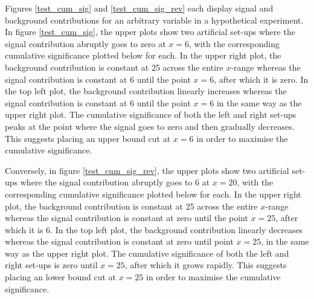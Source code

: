 Figures \ref{test_cum_sig} and \ref{test_cum_sig_rev} each display signal and background contributions for an arbitrary variable in a hypothetical experiment. In figure \ref{test_cum_sig}, the upper plots show two artificial set-ups where the signal contribution abruptly goes to zero at $x=6$, with the corresponding cumulative significance plotted below for each. In the upper right plot, the background contribution is constant at 25 across the entire $x$-range whereas the signal contribution is constant at 6 until the point $x=6$, after which it is zero. In the top left plot, the background contribution linearly increases whereas the signal contribution is constant at 6 until the point $x=6$ in the same way as the upper right plot. The cumulative significance of both the left and right set-ups peaks at the point where the signal goes to zero and then gradually decreases. This suggests placing an upper bound cut at $x = 6$ in order to maximise the cumulative significance.

Conversely, in figure \ref{test_cum_sig_rev}, the upper plots show two artificial set-ups where the signal contribution abruptly goes to 6 at $x=20$, with the corresponding cumulative significance plotted below for each. In the upper right plot, the background contribution is constant at 25 across the entire $x$-range whereas the signal contribution is constant at zero until the point $x=25$, after which it is 6. In the top left plot, the background contribution linearly decreases whereas the signal contribution is constant at zero until point $x=25$, in the same way as the upper right plot. The cumulative significance of both the left and right set-ups is zero until $x=25$, after which it grows rapidly. This suggests placing an lower bound cut at $x = 25$ in order to maximise the cumulative significance.

